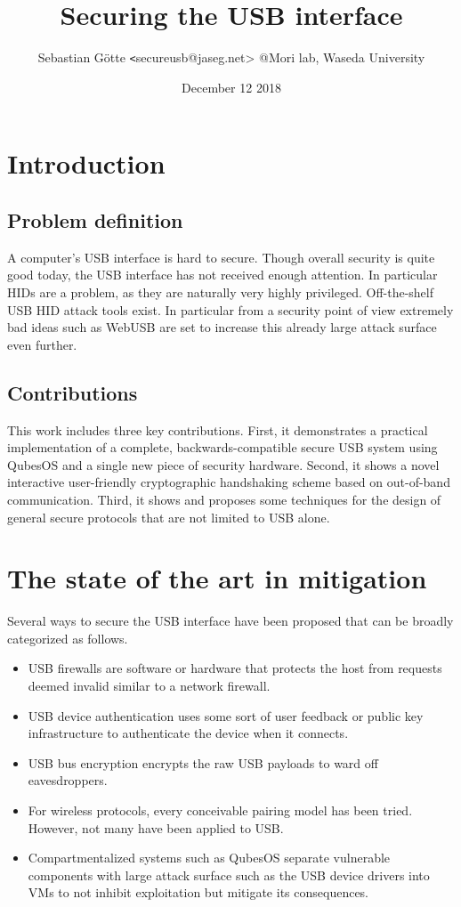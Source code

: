 \documentclass[12pt,a4paper,notitlepage]{article}
\author{Sebastian Götte {\texttt<secureusb@jaseg.net>} @Mori lab, Waseda University}
\title{Securing the USB interface}
\date{December 12 2018}
\begin{document}
\maketitle

\section{Introduction}
\subsection{Problem definition}
A computer's USB interface is hard to secure. Though overall security is quite good today, the USB interface has not
received enough attention. In particular HIDs are a problem, as they are naturally very highly privileged.
Off-the-shelf USB HID attack tools exist. In particular from a security point of view extremely bad ideas such as
WebUSB\cite{misc01} are set to increase this already large attack surface even further.

\subsection{Contributions}
This work includes three key contributions. First, it demonstrates a practical implementation of a complete,
backwards-compatible secure USB system using QubesOS and a single new piece of security hardware.  Second, it shows a
novel interactive user-friendly cryptographic handshaking scheme based on out-of-band communication. Third, it shows and
proposes some techniques for the design of general secure protocols that are not limited to USB alone.

\section{The state of the art in mitigation}
Several ways to secure the USB interface have been proposed that can be broadly categorized as follows.
\begin{itemize}
    \item USB firewalls are software or hardware that protects the host from requests deemed invalid similar to a network firewall\cite{tian01,angel01,kang01,bates01,loe01}.
    \item USB device authentication uses some sort of user feedback or public key infrastructure to authenticate the device when it connects\cite{usb01,griscioli01,wang01,he01}.
    \item USB bus encryption encrypts the raw USB payloads to ward off eavesdroppers\cite{neugschwandtner01,weinstein01}.
    \item For wireless protocols, every conceivable pairing model has been tried. However, not many have been applied to
        USB\cite{arun01,uzun01,kobsa01,saxena01}.
    \item Compartmentalized systems such as QubesOS separate vulnerable components with large attack surface such as the USB device drivers into VMs to not inhibit exploitation but mitigate its consequences.
\end{itemize}
\end{document}
